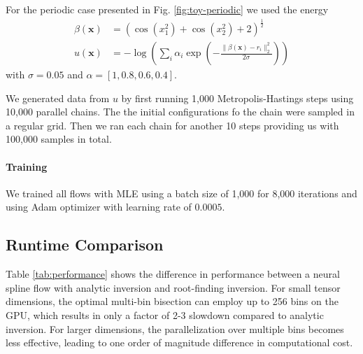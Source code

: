 \documentclass{article}
\begin{document}
For the periodic case presented in Fig. \ref{fig:toy-periodic} we used the energy
\begin{align}
    \beta(\bm x) &= \left( \cos\left(x_{1}^{2}\right) + \cos\left(x_{2}^{2}\right) + 2 \right)^{\frac{1}{2}} \\
    u(\bm x) &= -\log\left(\sum_{i} \alpha_{i} \exp\left(-\frac{\| \beta(\bm x) - r_{i}\|_2^2}{2 \sigma}\right) \right)
\end{align}
with $\sigma = 0.05$ and $\alpha =\left[ 1, 0.8, 0.6, 0.4 \right]$.

We generated data from $u$ by first running 1,000  Metropolis-Hastings  steps using 10,000 parallel chains. The the initial configurations fo the chain were sampled in a regular grid. Then we ran each chain for another 10 steps providing us with 100,000 samples in total.

\paragraph{Training}
We trained all flows with MLE using a batch size of 1,000 for 8,000 iterations and using Adam \cite{kingma2014adam} optimizer with learning rate of $0.0005$.

\subsection{Runtime Comparison}


Table \ref{tab:performance} shows the difference in performance between a neural spline flow with analytic inversion and root-finding inversion. For small tensor dimensions, the optimal multi-bin bisection can employ up to 256 bins on the GPU, which results in only a factor of 2-3 slowdown compared to analytic inversion. For larger dimensions, the parallelization over multiple bins becomes less effective, leading to one order of magnitude difference in computational cost.
\end{document}
